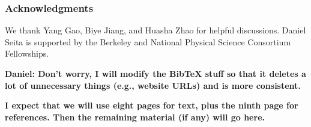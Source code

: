\documentclass{article} %
\begin{document}
\subsubsection*{Acknowledgments}

We thank Yang Gao, Biye Jiang, and Huasha Zhao for helpful discussions. Daniel Seita is supported by
the Berkeley and National Physical Science Consortium Fellowships.

\textbf{Daniel: Don't worry, I will modify the BibTeX stuff so that it deletes a lot of unnecessary
things (e.g., website URLs) and is more consistent.}











\clearpage
\appendix

\textbf{I expect that we will use eight pages for text, plus the ninth page for references. Then the
remaining material (if any) will go here.}




\end{document}
